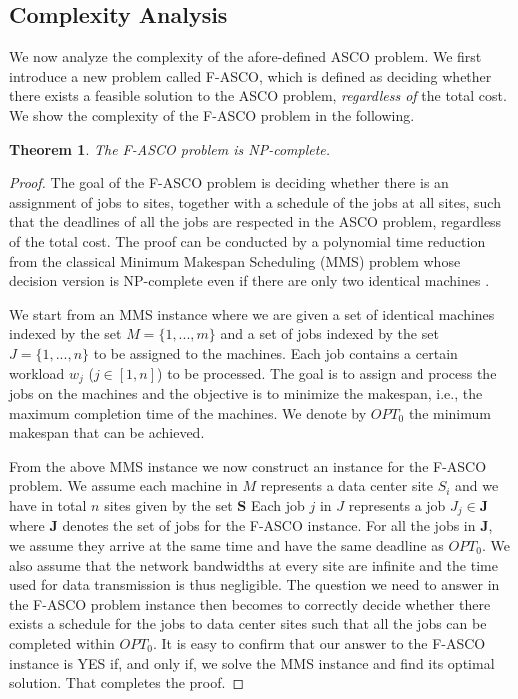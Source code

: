 \documentclass{article}
\newtheorem{theorem}{Theorem}
\begin{document}
\subsection{Complexity Analysis}
We now analyze the complexity of the afore-defined ASCO problem. We first introduce a new problem called F-ASCO, which is defined as deciding whether there exists a feasible solution to the ASCO problem, \textit{regardless of} the total cost. We show the complexity of the F-ASCO problem in the following.
\begin{theorem}
The F-ASCO problem is NP-complete.
\end{theorem}
\begin{proof}
The goal of the F-ASCO problem is deciding whether there is an assignment of jobs to sites, together with a schedule of the jobs at all sites, such that the deadlines of all the jobs are respected in the ASCO problem, regardless of the total cost. The proof can be conducted by a polynomial time reduction from the classical Minimum Makespan Scheduling (MMS)  problem whose decision version is NP-complete even if there are only two identical machines \cite{Garey-MMS-1979}. 

We start from an MMS instance where we are given a set of identical machines indexed by the set $M = \{1, ..., m\}$ and a set of jobs indexed by the set $J = \{1,...,n\}$ to be assigned to the machines. Each job contains a certain workload $w_j$ ($j \in [1, n]$) to be processed. The goal is to assign and process the jobs on the machines and the objective is to minimize the makespan, i.e., the maximum completion time of the machines. We denote by $OPT_{0}$ the minimum makespan that can be achieved.

From the above MMS instance we now construct an instance for the F-ASCO problem. We assume each machine in $M$ represents a data center site $S_i$ and we have in total $n$ sites given by the set $\mathbf{S}$ Each job $j$ in $J$ represents a job $J_j \in \mathbf{J}$ where $\mathbf{J}$ denotes the set of jobs for the F-ASCO instance. For all the jobs in $\mathbf{J}$, we assume they arrive at the same time and have the same deadline as $OPT_0$. We also assume that the network bandwidths at every site are infinite and the time used for data transmission is thus negligible. The question we need to answer in the F-ASCO problem instance then becomes to correctly decide whether there exists a schedule for the jobs to data center sites such that all the jobs can be completed within $OPT_0$. It is easy to confirm that our answer to the F-ASCO instance is YES if, and only if, we solve the MMS instance and find its optimal solution. That completes the proof.
\end{proof}
\end{document}
